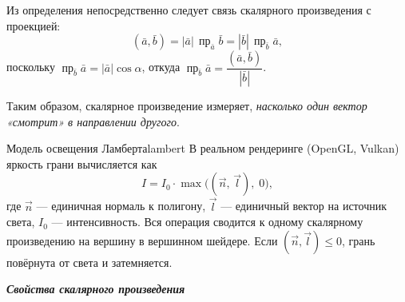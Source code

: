 \documentclass[12pt,a4paper]{article}
\newcommand{\va}{\bar{a}}
\newcommand{\vb}{\bar{b}}
\begin{document}
\noindent
Из определения непосредственно следует связь скалярного произведения
с проекцией:
\[
  (\va,\vb) = |\va|\,\operatorname{пр}_{\va}\vb
  = |\vb|\,\operatorname{пр}_{\vb}\va,
\]
поскольку $\operatorname{пр}_{\vb}\va = |\va|\cos\alpha$, откуда
$\operatorname{пр}_{\vb}\va = \dfrac{(\va,\vb)}{|\vb|}$.

Таким образом, скалярное произведение измеряет,
\textit{насколько один вектор «смотрит» в направлении другого}.

\begin{remarkIT}{Модель освещения Ламберта}{lambert}
  В реальном рендеринге (OpenGL, Vulkan) яркость грани вычисляется как
  \[
    I = I_0 \cdot \max\!\bigl((\vec{n},\,\vec{l}),\;0\bigr),
  \]
  где $\vec{n}$ --- единичная нормаль к полигону, $\vec{l}$ ---
  единичный вектор на источник света, $I_0$ --- интенсивность.
  Вся операция сводится к одному скалярному произведению на вершину
  в вершинном шейдере. Если $(\vec{n},\vec{l})\le 0$, грань
  повёрнута от света и затемняется.
\end{remarkIT}

\medskip

\textbf{\textit{Свойства скалярного произведения}}
\end{document}
